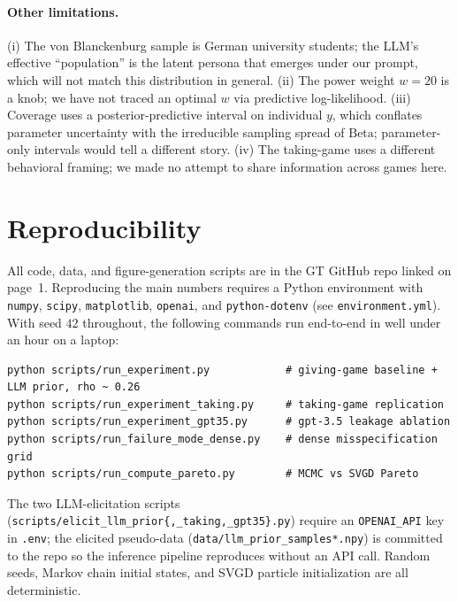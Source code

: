 \documentclass[11pt]{article}
\newcommand{\Beta}{\mathrm{Beta}}
\begin{document}
\paragraph{Other limitations.}
(i) The von Blanckenburg sample is German university students; the LLM's effective ``population''
is the latent persona that emerges under our prompt, which will not match this distribution
in general. (ii) The power weight $w=20$ is a knob; we have not traced an optimal $w$ via
predictive log-likelihood. (iii) Coverage uses a posterior-predictive interval on individual
$y$, which conflates parameter uncertainty with the irreducible sampling spread of $\Beta$;
parameter-only intervals would tell a different story. (iv) The taking-game uses a different
behavioral framing; we made no attempt to share information across games here.

\section{Reproducibility}

All code, data, and figure-generation scripts are in the GT GitHub repo linked on page~1.
Reproducing the main numbers requires a Python environment with \texttt{numpy}, \texttt{scipy},
\texttt{matplotlib}, \texttt{openai}, and \texttt{python-dotenv} (see \texttt{environment.yml}).
With seed $42$ throughout, the following commands run end-to-end in well under an hour on a
laptop:
\begin{verbatim}
python scripts/run_experiment.py            # giving-game baseline + LLM prior, rho ~ 0.26
python scripts/run_experiment_taking.py     # taking-game replication
python scripts/run_experiment_gpt35.py      # gpt-3.5 leakage ablation
python scripts/run_failure_mode_dense.py    # dense misspecification grid
python scripts/run_compute_pareto.py        # MCMC vs SVGD Pareto
\end{verbatim}
The two LLM-elicitation scripts (\texttt{scripts/elicit\_llm\_prior\{,\_taking,\_gpt35\}.py})
require an \texttt{OPENAI\_API} key in \texttt{.env}; the elicited pseudo-data
(\texttt{data/llm\_prior\_samples*.npy}) is committed to the repo so the inference
pipeline reproduces without an API call. Random seeds, Markov chain initial states, and SVGD
particle initialization are all deterministic.



\end{document}
